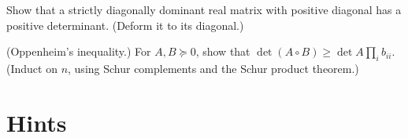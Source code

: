 \begin{exercise}[$\star\star$]\label{ex:diagdomdet}
Show that a strictly diagonally dominant real matrix with positive diagonal has a positive determinant. (Deform it to its diagonal.)
\end{exercise}

\begin{exercise}[$\star\star\star$]\label{ex:oppenheim}
(Oppenheim's inequality.) For $A,B\succeq0$, show that $\det(A\circ B)\ge\det A\prod_ib_{ii}$. (Induct on $n$, using Schur complements
and the Schur product theorem.)
\end{exercise}

\section{Hints}

